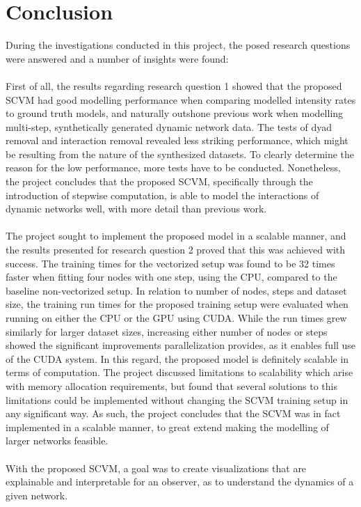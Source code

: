 \section{Conclusion}

During the investigations conducted in this project, the posed research questions were answered and a number of insights were found:
\\\\
First of all, the results regarding research question 1 showed that the proposed SCVM had good modelling performance when comparing modelled intensity rates to ground truth models, and naturally outshone previous work when modelling multi-step, synthetically generated dynamic network data.
The tests of dyad removal and interaction removal revealed less striking performance, which might be resulting from the nature of the synthesized datasets. 
To clearly determine the reason for the low performance, more tests have to be conducted.
Nonetheless, the project concludes that the proposed SCVM, specifically through the introduction of stepwise computation, is able to model the interactions of dynamic networks well, with more detail than previous work.
\\\\
The project sought to implement the proposed model in a scalable manner, and the results presented for research question 2 proved that this was achieved with success.
The training times for the vectorized setup was found to be 32 times faster when fitting four nodes with one step, using the CPU, compared to the baseline non-vectorized setup.
In relation to number of nodes, steps and dataset size, the training run times for the proposed training setup were evaluated when running on either the CPU or the GPU using CUDA.
While the run times grew similarly for larger dataset sizes, increasing either number of nodes or steps showed the significant improvements parallelization provides, as it enables full use of the CUDA system. 
In this regard, the proposed model is definitely scalable in terms of computation.
The project discussed limitations to scalability which arise with memory allocation requirements, but found that several solutions to this limitations could be implemented without changing the SCVM training setup in any significant way.
As such, the project concludes that the SCVM was in fact implemented in a scalable manner, to great extend making the modelling of larger networks feasible.
\\\\
With the proposed SCVM, a goal was to create visualizations that are explainable and interpretable for an observer, as to understand the dynamics of a given network.
